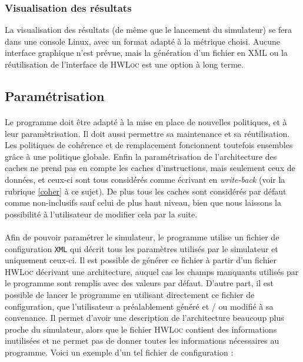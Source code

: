 \subsubsection{Visualisation des résultats}

La visualisation des résultats (de même que le lancement du simulateur) se fera dans une console Linux, avec un format adapté à la métrique choisi. Aucune interface graphique n'est prévue, mais la génération d'un fichier en \textsc{XML} ou la réutilisation de l'interface de \textsc{HWLoc} est une option à long terme.

\subsection{Paramétrisation}
\label{param}

\paragraph{}
Le programme doit être adapté à la mise en place de nouvelles politiques, et à leur paramètrisation. Il doit aussi permettre sa maintenance et sa réutilisation. Les politiques de cohérence et de remplacement foncionnent toutefois ensembles grâce à une politique globale. Enfin la paramétrisation de l'architecture des caches ne prend pas en compte les caches d'instructions, mais seulement ceux de données, et ceux-ci sont tous considérés comme écrivant en \emph{write-back} (voir la rubrique \ref{coher} à ce sujet). De plus tous les caches sont considérés par défaut comme non-inclusifs sauf celui de plus haut niveau, bien que nous laissons la possibilité à l'utilisateur de modifier cela par la suite.

\paragraph{}
Afin de pouvoir paramétrer le simulateur, le programme utilise un fichier de configuration \texttt{XML} qui décrit tous les paramètres utilisés par le simulateur et uniquement ceux-ci. Il est possible de générer ce fichier à partir d'un fichier \textsc{HWLoc} décrivant une architecture, auquel cas les champs manquants utilisés par le programme sont remplis avec des valeurs par défaut. D'autre part, il est possible de lancer le programme en utilisant directement ce fichier de configuration, que l'utilisateur a préalablement généré et / ou modifié à sa convenance. Il permet d'avoir une description de l'architecture beaucoup plus proche du simulateur, alors que le fichier \textsc{HWLoc} contient des informations inutilisées et ne permet pas de donner toutes les informations nécessaires au programme. Voici un exemple d'un tel fichier de configuration :

